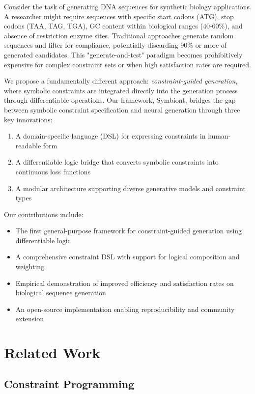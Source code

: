 \documentclass[conference]{IEEEtran}
\begin{document}
Consider the task of generating DNA sequences for synthetic biology applications. A researcher might require sequences with specific start codons (ATG), stop codons (TAA, TAG, TGA), GC content within biological ranges (40-60\%), and absence of restriction enzyme sites. Traditional approaches generate random sequences and filter for compliance, potentially discarding 90\% or more of generated candidates. This "generate-and-test" paradigm becomes prohibitively expensive for complex constraint sets or when high satisfaction rates are required.

We propose a fundamentally different approach: \textit{constraint-guided generation}, where symbolic constraints are integrated directly into the generation process through differentiable operations. Our framework, Symbiont, bridges the gap between symbolic constraint specification and neural generation through three key innovations:

\begin{enumerate}
    \item A domain-specific language (DSL) for expressing constraints in human-readable form
    \item A differentiable logic bridge that converts symbolic constraints into continuous loss functions
    \item A modular architecture supporting diverse generative models and constraint types
\end{enumerate}

Our contributions include:
\begin{itemize}
    \item The first general-purpose framework for constraint-guided generation using differentiable logic
    \item A comprehensive constraint DSL with support for logical composition and weighting
    \item Empirical demonstration of improved efficiency and satisfaction rates on biological sequence generation
    \item An open-source implementation enabling reproducibility and community extension
\end{itemize}

\section{Related Work}

\subsection{Constraint Programming}
\end{document}
